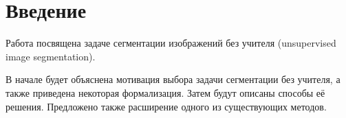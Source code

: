 \section{Введение}
Работа посвящена задаче сегментации изображений без учителя (unsupervised image segmentation).

В начале будет объяснена мотивация выбора задачи сегментации без учителя, а также приведена некоторая формализация.
Затем будут описаны способы её решения.
Предложено также расширение одного из существующих методов.
